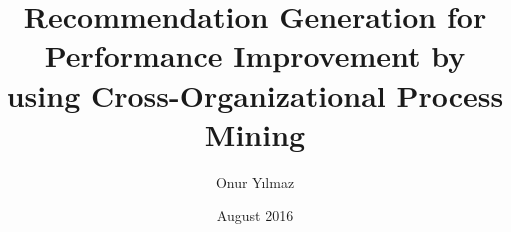 \documentclass[chaparabic,ceng,ms,12pt,oneandhalf]{metu}
\author{Onur Yılmaz}
\title{Recommendation Generation for Performance Improvement by using Cross-Organizational Process Mining}
\date{August 2016}
\theoremstyle{definition}
\begin{document}
\begin{preliminaries}


\end{preliminaries}
%   
% 
%









%


 
%
% 
\end{document}
